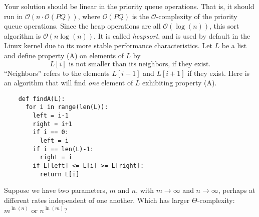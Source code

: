 \documentclass{exam} %
\theoremstyle{plain}
\theoremstyle{definition}
\theoremstyle{remark}
\numberwithin{equation}{section}  %
\renewcommand{\O}{\mathcal{O}}
\begin{document}
\begin{questions}
  Your solution should be linear in the priority queue operations. That is, it
  should run in $\O(n\cdot\O(PQ))$, where $\O(PQ)$ is the $\O$-complexity of
  the priority queue operations. Since the heap operations are all
  $\O(\log(n))$, this sort algorithm is $\O(n\log(n))$. It is called
  \emph{heapsort}, and is used by default in the Linux kernel due to its more
  stable performance characteristics.
  \question Let $L$ be a list and define property (A) on elements of $L$ by
  \[ \tag{A}
    \text{$L[i]$ is not smaller than its neighbors, if they exist}.
  \]
  ``Neighbors'' refers to the elements $L[i-1]$ and $L[i+1]$ if they exist.
  Here is an algorithm that will find \emph{one} element of $L$ exhibiting
  property (A).
  \begin{verbatim}
    def findA(L):
      for i in range(len(L)):
        left = i-1
        right = i+1
        if i == 0:
          left = i
        if i == len(L)-1:
          right = i
        if L[left] <= L[i] >= L[right]:
          return L[i]
  \end{verbatim}
  \question Suppose we have two parameters, $m$ and $n$, with $m\to \infty$
  and $n\to \infty$, perhaps at different rates independent of one another.
  Which has larger $\Theta$-complexity: $m^{\ln(n)}$ or $n^{\ln(m)}$?
  \end{questions} 
\end{document}

